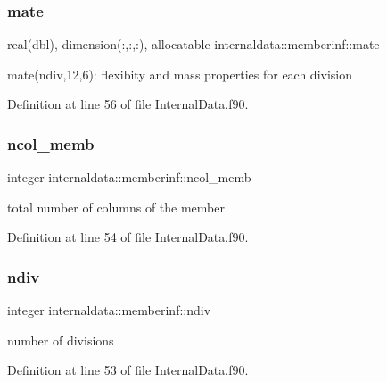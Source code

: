 \subsubsection{\texorpdfstring{mate}{mate}}
{\footnotesize\ttfamily real(dbl), dimension(\+:,\+:,\+:), allocatable internaldata\+::memberinf\+::mate}



mate(ndiv,12,6)\+: flexibity and mass properties for each division 



Definition at line 56 of file Internal\+Data.\+f90.

\mbox{\label{structinternaldata_1_1memberinf_abff7a37a6411bc3bd96131bfccf98e91}} 
\subsubsection{\texorpdfstring{ncol\+\_\+memb}{ncol\_memb}}
{\footnotesize\ttfamily integer internaldata\+::memberinf\+::ncol\+\_\+memb}



total number of columns of the member 



Definition at line 54 of file Internal\+Data.\+f90.

\mbox{\label{structinternaldata_1_1memberinf_a2af474d1d2e3a33ab9b4c932575a2294}} 
\subsubsection{\texorpdfstring{ndiv}{ndiv}}
{\footnotesize\ttfamily integer internaldata\+::memberinf\+::ndiv}



number of divisions 



Definition at line 53 of file Internal\+Data.\+f90.

\mbox{\label{structinternaldata_1_1memberinf_aedb5a98d6a0011605f5458f065019a01}} 
